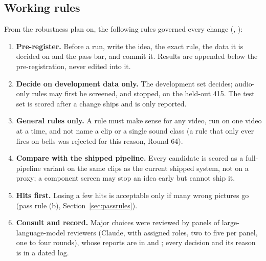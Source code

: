 \subsection{Working rules}\label{sec:rules}
From the robustness plan on, the following rules governed every change (,
):
\begin{enumerate}
  \item \textbf{Pre-register.} Before a run, write the idea, the exact rule, the data it is decided on and the pass
        bar, and commit it. Results are appended below the pre-registration, never edited into it.
  \item \textbf{Decide on development data only.} The development set decides; audio-only rules may first be
        screened, and stopped, on the held-out 415. The test set is scored after a change ships and is only reported.
  \item \textbf{General rules only.} A rule must make sense for any video, run on one video at a time, and not name a
        clip or a single sound class (a rule that only ever fires on bells was rejected for this reason, Round 64).
  \item \textbf{Compare with the shipped pipeline.} Every candidate is scored as a full-pipeline variant on the same
        clips as the current shipped system, not on a proxy; a component screen may stop an idea early but cannot
        ship it.
  \item \textbf{Hits first.} Losing a few hits is acceptable only if many wrong pictures go (pass rule (b),
        Section~\ref{sec:passrules}).
  \item \textbf{Consult and record.} Major choices were reviewed by panels of large-language-model reviewers (Claude, with assigned roles, two to five per panel, one to four rounds), whose reports are in
         and ; every decision and its reason is in a dated log.
\end{enumerate}

